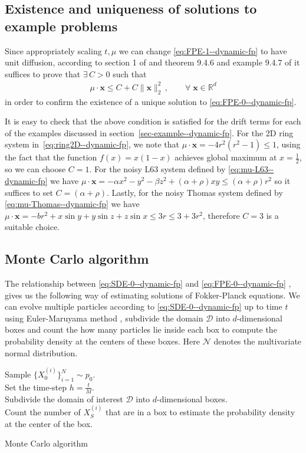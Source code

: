 \subsection{Existence and uniqueness of solutions to example problems}\label{ssec-unique--dynamic-fp} Since appropriately scaling $t,\mu$ we can change \eqref{eq:FPE-1--dynamic-fp} to have unit diffusion, according to section 1 of \cite{bogachev2021uniqueness} and theorem 9.4.6 and example 9.4.7 of \cite{bogachev2022fokker} it suffices to prove that $\exists\, C>0$ such that
\begin{align}
    \mu\cdot \mathbf x \le C+C\|\mathbf x\|_2^2\,,\qquad\forall\;\mathbf x\in\mathbb R^d
\end{align}
in order to confirm the existence of a unique solution to \eqref{eq:FPE-0--dynamic-fp}. 

It is easy to check that the above condition is satisfied for the drift terms for each of the examples discussed in section~\ref{sec-example--dynamic-fp}. For the 2D ring system in~\eqref{eq:ring2D--dynamic-fp}, we note that $\mu\cdot\mathbf x= -4r^2(r^2-1)\le 1$, using the fact that the function $f(x)=x(1-x)$ achieves global maximum at $x=\frac{1}{2}$, so we can choose $C = 1$. For the noisy L63 system defined by \eqref{eq:mu-L63--dynamic-fp} we have $\mu\cdot\mathbf x =-\alpha x^2-y^2-\beta z^2+(\alpha+\rho) xy\le (\alpha+\rho)r^2$ so it suffices to set $C=(\alpha+\rho)$. Lastly, for the noisy Thomas system defined by \eqref{eq:mu-Thomas--dynamic-fp} we have $\mu\cdot\mathbf x =-br^2 + x\sin y + y\sin z + z\sin x \le 3r\le 3+3r^2$, therefore $C=3$ is a suitable choice.


\subsection{Monte Carlo algorithm}\label{ssec-algo-MC--dynamic-fp}
The relationship between \eqref{eq:SDE-0--dynamic-fp} and \eqref{eq:FPE-0--dynamic-fp}  \cite{risken1996fokker}, \cite{bogachev2022fokker} gives us the following way of estimating solutions of Fokker-Planck equations. We can evolve multiple particles according to \eqref{eq:SDE-0--dynamic-fp} up to time $t$ using Euler-Maruyama method \cite{kloeden1992stochastic}, subdivide the domain $\mathcal D$ into $d$-dimensional boxes and count the how many particles lie inside each box to compute the probability density at the centers of these boxes. Here $\mathcal N$ denotes the multivariate normal distribution.
\begin{algorithm}[!htp]
Sample $\{ X_0^{(i)}\}_{i=1}^N\sim p_0$.\\
Set the time-step $h=\frac{t}{M}$.\\
Subdivide the domain of interest $\mathcal D$ into $d$-dimensional boxes.\\ Count the number of $X^{(i)}_{S}$ that are in a box to estimate the probability density at the center of the box.
\caption{Monte Carlo algorithm}\label{algo:MC--dynamic-fp}
\end{algorithm}